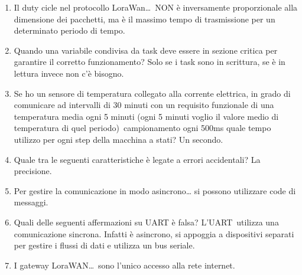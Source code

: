 \documentclass[
]{article}
\begin{document}
\begin{enumerate}
{to in quale di queste casistiche? In nessuna, i messaggi downlink
  vengono inviati solo come risposta di uno uplink non importa la
  classe.}
\item
  {Il duty cicle nel protocollo }{LoraWan\ldots{}}{~NON è inversamente
  proporzionale alla dimensione dei pacchetti, ma è il massimo tempo di
  trasmissione per un determinato periodo di tempo.}
\item
  {Quando una variabile condivisa da task deve essere in sezione critica
  per garantire il corretto funzionamento? Solo se i task sono in
  scrittura, se è in lettura invece non c'è bisogno.}
\item
  {Se ho un sensore di temperatura collegato alla corrente elettrica, in
  grado di comunicare ad intervalli di 30 minuti }{con un requisito
  funzionale di una temperatura media ogni 5 minuti (ogni 5 minuti
  voglio il valore medio di temperatura di quel periodo)}{~campionamento
  ogni 500ms quale tempo utilizzo per ogni step della macchina a stati?
  Un secondo.}
\item
  {Quale tra le seguenti caratteristiche è legate a errori accidentali?
  La precisione.}
\item
  {Per gestire la comunicazione in modo asincrono\ldots{} si possono
  utilizzare code di messaggi.}
\item
  {Quali delle seguenti affermazioni su UART è falsa?
  }{L'UART}{~utilizza una comunicazione sincrona. Infatti è asincrono,
  si appoggia a dispositivi separati per gestire i flussi di dati e
  utilizza un bus seriale.}
\item
  {I gateway }{LoraWAN\ldots{}}{~sono l'unico accesso alla rete
  internet.}
\end{enumerate}
\end{document}
